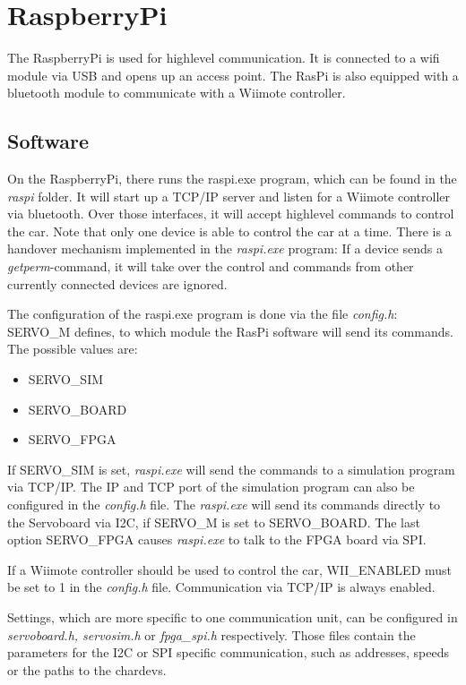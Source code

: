 \documentclass[a4paper
               ,10pt
               ,DIV=10 %
               ,BCOR=0.3cm
               ,pagesize %
               ,headings=small
               ,bibtotoc
               ]
               {scrartcl}
\begin{document}
\section{RaspberryPi}
The RaspberryPi is used for highlevel communication.
It is connected to a wifi module via USB and opens up an access point.
The RasPi is also equipped with a bluetooth module to communicate with a Wiimote controller.

\subsection{Software}
On the RaspberryPi, there runs the raspi.exe program, which can be found in the \textit{raspi} folder.
It will start up a TCP/IP server and listen for a Wiimote controller via bluetooth.
Over those interfaces, it will accept highlevel commands to control the car.
Note that only one device is able to control the car at a time.
There is a handover mechanism implemented in the \textit{raspi.exe} program: If a device sends a \textit{getperm}-command, it will take over the control and commands from other currently connected devices are ignored.


The configuration of the raspi.exe program is done via the file \textit{config.h}:
SERVO\_M defines, to which module the RasPi software will send its commands. The possible values are:
\begin{itemize}
\item{SERVO\_SIM}
\item{SERVO\_BOARD}
\item{SERVO\_FPGA}
\end{itemize}

If SERVO\_SIM is set, \textit{raspi.exe} will send the commands to a simulation program via TCP/IP.
The IP and TCP port of the simulation program can also be configured in the \textit{config.h} file.
The \textit{raspi.exe} will send its commands directly to the Servoboard via I2C, if SERVO\_M is set to SERVO\_BOARD.
The last option SERVO\_FPGA causes \textit{raspi.exe} to talk to the FPGA board via SPI.

If a Wiimote controller should be used to control the car, WII\_ENABLED must be set to 1 in the \textit{config.h} file.
Communication via TCP/IP is always enabled.

Settings, which are more specific to one communication unit, can be configured in \textit{servoboard.h, servosim.h} or \textit{fpga\_spi.h} respectively. Those files contain the parameters for the I2C or SPI specific communication, such as addresses, speeds or the paths to the chardevs.
\end{document}
